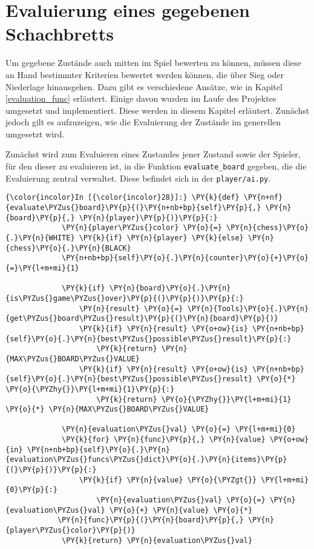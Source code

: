     \section{Evaluierung eines gegebenen
Schachbretts}\label{evaluierung-eines-gegebenen-schachbretts}

    Um gegebene Zustände auch mitten im Spiel bewerten zu können, müssen
diese an Hand bestimmter Kriterien bewertet werden können, die über Sieg
oder Niederlage hinausgehen. Dazu gibt es verschiedene Ansätze, wie in
Kapitel \ref{evaluation_func} erläutert. Einige davon wurden im Laufe des Projektes
umgesetzt und implementiert. Diese werden in diesem Kapitel erläutert.
Zunächst jedoch gilt es aufzuzeigen, wie die Evaluierung der Zustände im
generellen umgesetzt wird.

Zunächst wird zum Evaluieren eines Zustandes jener Zustand sowie der
Spieler, für den dieser zu evaluieren ist, in die Funktion
\texttt{evaluate\_board} gegeben, die die Evaluierung zentral verwaltet.
Diese befindet sich in der \texttt{player/ai.py}.

    \begin{Verbatim}[commandchars=\\\{\}]
{\color{incolor}In [{\color{incolor}28}]:} \PY{k}{def} \PY{n+nf}{evaluate\PYZus{}board}\PY{p}{(}\PY{n+nb+bp}{self}\PY{p}{,} \PY{n}{board}\PY{p}{,} \PY{n}{player}\PY{p}{)}\PY{p}{:}
             \PY{n}{player\PYZus{}color} \PY{o}{=} \PY{n}{chess}\PY{o}{.}\PY{n}{WHITE} \PY{k}{if} \PY{n}{player} \PY{k}{else} \PY{n}{chess}\PY{o}{.}\PY{n}{BLACK}
             \PY{n+nb+bp}{self}\PY{o}{.}\PY{n}{counter}\PY{o}{+}\PY{o}{=}\PY{l+m+mi}{1}
         
             \PY{k}{if} \PY{n}{board}\PY{o}{.}\PY{n}{is\PYZus{}game\PYZus{}over}\PY{p}{(}\PY{p}{)}\PY{p}{:}
                 \PY{n}{result} \PY{o}{=} \PY{n}{Tools}\PY{o}{.}\PY{n}{get\PYZus{}board\PYZus{}result}\PY{p}{(}\PY{n}{board}\PY{p}{)}
                 \PY{k}{if} \PY{n}{result} \PY{o+ow}{is} \PY{n+nb+bp}{self}\PY{o}{.}\PY{n}{best\PYZus{}possible\PYZus{}result}\PY{p}{:}
                     \PY{k}{return} \PY{n}{MAX\PYZus{}BOARD\PYZus{}VALUE}
                 \PY{k}{if} \PY{n}{result} \PY{o+ow}{is} \PY{n+nb+bp}{self}\PY{o}{.}\PY{n}{best\PYZus{}possible\PYZus{}result} \PY{o}{*} \PY{o}{\PYZhy{}}\PY{l+m+mi}{1}\PY{p}{:}
                     \PY{k}{return} \PY{o}{\PYZhy{}}\PY{l+m+mi}{1} \PY{o}{*} \PY{n}{MAX\PYZus{}BOARD\PYZus{}VALUE}
         
             \PY{n}{evaluation\PYZus{}val} \PY{o}{=} \PY{l+m+mi}{0}
             \PY{k}{for} \PY{n}{func}\PY{p}{,} \PY{n}{value} \PY{o+ow}{in} \PY{n+nb+bp}{self}\PY{o}{.}\PY{n}{evaluation\PYZus{}funcs\PYZus{}dict}\PY{o}{.}\PY{n}{items}\PY{p}{(}\PY{p}{)}\PY{p}{:}
                 \PY{k}{if} \PY{n}{value} \PY{o}{\PYZgt{}} \PY{l+m+mi}{0}\PY{p}{:}
                     \PY{n}{evaluation\PYZus{}val} \PY{o}{=} \PY{n}{evaluation\PYZus{}val} \PY{o}{+} \PY{n}{value} \PY{o}{*} 
			\PY{n}{func}\PY{p}{(}\PY{n}{board}\PY{p}{,} \PY{n}{player\PYZus{}color}\PY{p}{)}
             \PY{k}{return} \PY{n}{evaluation\PYZus{}val}
\end{Verbatim}


